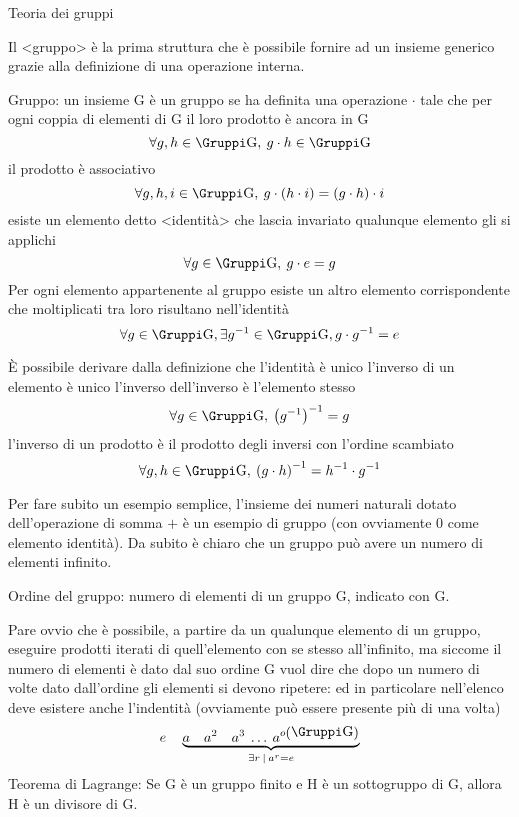 \capitolo Teoria dei gruppi

Il \evidenzia<gruppo> \`e la prima struttura che \`e possibile fornire ad un insieme generico
grazie alla definizione di una operazione interna.

 Gruppo: un insieme \gruppo G \`e un gruppo se ha definita una operazione $\cdot$
tale che
\unorderedlist
\li per ogni coppia di elementi di \gruppo G il loro prodotto \`e ancora in \gruppo G
$$
\forall g,h\in\gruppo G,\>g\cdot h\in \gruppo G
$$
\li il prodotto \`e associativo
$$
\forall g,h,i\in \gruppo G,\> g\cdot\left(h\cdot i\right) = \left(g\cdot h\right)\cdot i
$$
\li esiste un elemento detto \evidenzia<identit\`a> che lascia invariato qualunque elemento gli si applichi
$$
\forall g\in \gruppo G,\>g\cdot e=g
$$
\li Per ogni elemento appartenente al gruppo esiste un altro elemento corrispondente che moltiplicati tra
loro risultano nell'identit\`a
$$
\forall g\in\gruppo G,\exists g^{-1}\in\gruppo G, g\cdot g^{-1} = e
$$
\endunorderedlist

\`E possibile derivare dalla definizione che
\unorderedlist
\li l'identit\`a \`e unico
\li l'inverso di un elemento \`e unico
\li l'inverso dell'inverso \`e l'elemento stesso
$$
\forall g\in\gruppo G,\>\left(g^{-1}\right)^{-1} = g
$$
\li l'inverso di un prodotto \`e il prodotto degli inversi con l'ordine scambiato
$$
\forall g,h\in\gruppo G,\>\left(g\cdot h\right)^{-1} = h^{-1}\cdot g^{-1}
$$
\endunorderedlist

Per fare subito un esempio semplice, l'insieme dei numeri naturali dotato dell'operazione
di somma $+$ \`e un esempio di gruppo (con ovviamente $0$ come elemento identit\`a). Da subito
\`e chiaro che un gruppo pu\`o avere un numero di elementi infinito.

 Ordine del gruppo: numero di elementi di un gruppo \gruppo G, indicato con \ordinegruppo G.

Pare ovvio che \`e possibile, a partire da un qualunque elemento di un gruppo, eseguire prodotti iterati
di quell'elemento con se stesso all'infinito, ma siccome il numero di elementi \`e dato dal suo ordine
\ordinegruppo G vuol dire che dopo un numero di volte dato dall'ordine gli elementi si devono ripetere:
ed in particolare nell'elenco deve esistere anche l'indentit\`a (ovviamente pu\`o essere presente
pi\`u di una volta)
$$
e\quad\underbrace{a\quad a^2\quad a^3\>\dots\> a^{o\left(\gruppo G\right)}}_{\exists r\>|\> a^r=e}
$$
\teorema Teorema di Lagrange: Se \gruppo G \`e un gruppo finito e \gruppo H \`e un sottogruppo
di \gruppo G, allora \ordinegruppo H \`e un divisore di \ordinegruppo G.

